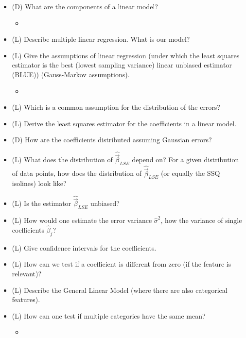 \begin{itemize}
    \item (D) What are the components of a linear model?
    \begin{itemize}
        \item {}
    \end{itemize}
    \item (L) Describe multiple linear regression. What is our model?
    \item (L) Give the assumptions of linear regression (under which the least squares estimator is the best (lowest sampling variance) linear unbiased estimator (BLUE)) (Gauss-Markov assumptions).
    \begin{itemize}
        \item {}
    \end{itemize}
    \item (L) Which is a common assumption for the distribution of the errors?
    \item (L) Derive the least squares estimator for the coefficients in a linear model.
    \item (D) How are the coefficients distributed assuming Gaussian errors?
    \item (L) What does the distribution of $\hat{\vec{\beta}}_{LSE}$ depend on? For a given distribution of data points, how does the distribution of $\hat{\vec{\beta}}_{LSE}$ (or equally the SSQ isolines) look like?
    \item (L) Is the estimator $\hat{\vec{\beta}}_{LSE}$ unbiased?
    \item (L) How would one estimate the error variance $\hat{\sigma}^2$, how the variance of single coefficients $\hat{\beta}_j$?
    \item (L) Give confidence intervals for the coefficients.
    \item (L) How can we test if a coefficient is different from zero (if the feature is relevant)?
    \item (L) Describe the General Linear Model (where there are also categorical features).
    \item (L) How can one test if multiple categories have the same mean?
    \begin{itemize}
        \item {}

\end{itemize}
\end{itemize}
